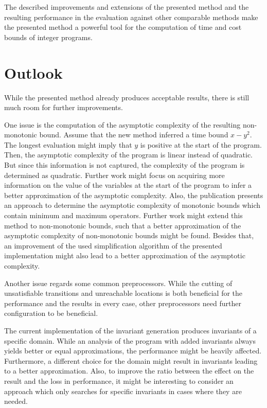 The described improvements and extensions of the presented method and the resulting performance in the evaluation against other comparable methods make the presented method a powerful tool for the computation of time and cost bounds of integer programs.

\section{Outlook}

While the presented method already produces acceptable results, there is still much room for further improvements.

One issue is the computation of the asymptotic complexity of the resulting non-monotonic bound.
Assume that the new method inferred a time bound $x-y^2$.
The longest evaluation might imply that $y$ is positive at the start of the program.
Then, the asymptotic complexity of the program is linear instead of quadratic.
But since this information is not captured, the complexity of the program is determined as quadratic.
Further work might focus on acquiring more information on the value of the variables at the start of the program to infer a better approximation of the asymptotic complexity.
Also, the publication \cite{albert2009asymptotic} presents an approach to determine the asymptotic complexity of monotonic bounds which contain minimum and maximum operators.
Further work might extend this method to non-monotonic bounds, such that a better approximation of the asymptotic complexity of non-monotonic bounds might be found.
Besides that, an improvement of the used simplification algorithm of the presented implementation might also lead to a better approximation of the asymptotic complexity.

Another issue regards some common preprocessors.
While the cutting of unsatisfiable transitions and unreachable locations is both beneficial for the performance and the results in every case, other preprocessors need further configuration to be beneficial.

The current implementation of the invariant generation produces invariants of a specific domain.
While an analysis of the program with added invariants always yields better or equal approximations, the performance might be heavily affected.
Furthermore, a different choice for the domain might result in invariants leading to a better approximation.
Also, to improve the ratio between the effect on the result and the loss in performance, it might be interesting to consider an approach which only searches for specific invariants in cases where they are needed.

